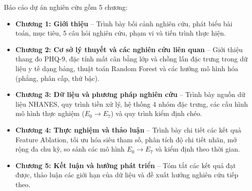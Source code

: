 Báo cáo dự án nghiên cứu gồm 5 chương:
\begin{itemize}
    \item \textbf{Chương 1: Giới thiệu} -- Trình bày bối cảnh nghiên cứu, phát biểu bài toán, mục tiêu, 5 câu hỏi nghiên cứu, phạm vi và tiến trình thực hiện.
    \item \textbf{Chương 2: Cơ sở lý thuyết và các nghiên cứu liên quan} -- Giới thiệu thang đo PHQ-9, đặc tính mất cân bằng lớp và chồng lấn đặc trưng trong dữ liệu y tế dạng bảng, thuật toán Random Forest và các hướng mô hình hóa (phẳng, phân cấp, thứ bậc).
    \item \textbf{Chương 3: Dữ liệu và phương pháp nghiên cứu} -- Trình bày nguồn dữ liệu NHANES, quy trình tiền xử lý, hệ thống 4 nhóm đặc trưng, các cấu hình mô hình thực nghiệm ($E_0 \to E_7$) và quy trình kiểm định chéo.
    \item \textbf{Chương 4: Thực nghiệm và thảo luận} -- Trình bày chi tiết các kết quả Feature Ablation, tối ưu hóa siêu tham số, phân tích độ chi tiết nhãn, mở rộng đa chu kỳ, so sánh các mô hình $E_0 \to E_7$ và kiểm định theo thời gian.
    \item \textbf{Chương 5: Kết luận và hướng phát triển} -- Tóm tắt các kết quả đạt được, thảo luận các giới hạn của dữ liệu và đề xuất hướng nghiên cứu tiếp theo.
\end{itemize}
